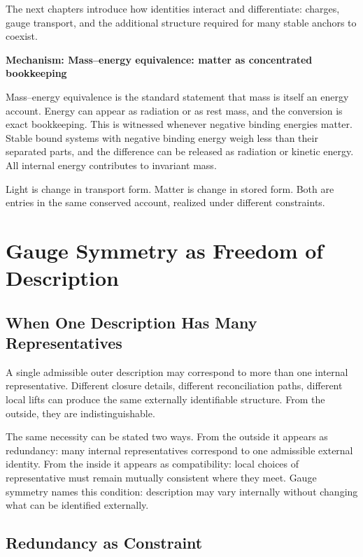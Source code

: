 \documentclass[11pt,twoside,openright]{book}
\newenvironment{mechanismbox}[1]
  {\begin{framed}\noindent\textbf{Mechanism: #1}\par\medskip}
  {\end{framed}}
\begin{document}
The next chapters introduce how identities interact and differentiate: charges, gauge transport, and the additional structure required for many stable anchors to coexist.

\begin{mechanismbox}{Mass--energy equivalence: matter as concentrated bookkeeping}

Mass--energy equivalence is the standard statement that mass is itself an energy account. Energy can appear as radiation or as rest mass, and the conversion is exact bookkeeping. This is witnessed whenever negative binding energies matter. Stable bound systems with negative binding energy weigh less than their separated parts, and the difference can be released as radiation or kinetic energy. All internal energy contributes to invariant mass.

Light is change in transport form. Matter is change in stored form. Both are entries in the same conserved account, realized under different constraints.

\end{mechanismbox}
\chapter{Gauge Symmetry as Freedom of Description}

\section*{When One Description Has Many Representatives}

A single admissible outer description may correspond to more than one internal representative. Different closure details, different reconciliation paths, different local lifts can produce the same externally identifiable structure. From the outside, they are indistinguishable.

\medskip

The same necessity can be stated two ways. From the outside it appears as redundancy: many internal representatives correspond to one admissible external identity. From the inside it appears as compatibility: local choices of representative must remain mutually consistent where they meet. Gauge symmetry names this condition: description may vary internally without changing what can be identified externally.

\section*{Redundancy as Constraint}
\end{document}
